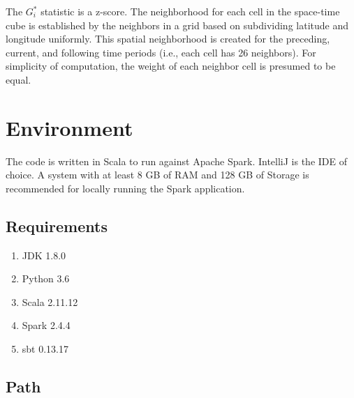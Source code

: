     The $G_i^*$ statistic is a z-score. The neighborhood for each cell in the space-time cube is established by the neighbors in a grid based on subdividing latitude and longitude uniformly. This spatial neighborhood is created for the preceding, current, and following time periods (i.e., each cell has 26 neighbors). For simplicity of computation, the weight of each neighbor cell is presumed to be equal.
    
\newpage

\section{Environment} \label{Environment}
The code is written in Scala to run against Apache Spark. IntelliJ is the IDE of choice. A system with at least 8 GB of RAM and 128 GB of Storage is recommended for locally running the Spark application.

\subsection{Requirements}
\begin{enumerate}
    \item JDK 1.8.0
    \item Python 3.6
    \item Scala 2.11.12
    \item Spark 2.4.4
    \item sbt 0.13.17
\end{enumerate}

\subsection{Path}

